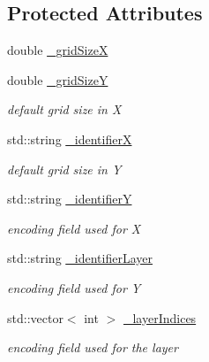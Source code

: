 \subsection*{Protected Attributes}
\begin{DoxyCompactItemize}
\item 
double \hyperlink{class_d_d4hep_1_1_d_d_segmentation_1_1_tiled_layer_segmentation_a8e60c82ed47b0b33c4c7918baea38296}{\_\-gridSizeX}
\item 
double \hyperlink{class_d_d4hep_1_1_d_d_segmentation_1_1_tiled_layer_segmentation_a71e5e4524b30002b118f464626558c39}{\_\-gridSizeY}
\begin{DoxyCompactList}\small\item\em default grid size in X \item\end{DoxyCompactList}\item 
std::string \hyperlink{class_d_d4hep_1_1_d_d_segmentation_1_1_tiled_layer_segmentation_ac79fffb5bdd56134ef2824ebb10ac1de}{\_\-identifierX}
\begin{DoxyCompactList}\small\item\em default grid size in Y \item\end{DoxyCompactList}\item 
std::string \hyperlink{class_d_d4hep_1_1_d_d_segmentation_1_1_tiled_layer_segmentation_af157c59a13254572f336a345463e993d}{\_\-identifierY}
\begin{DoxyCompactList}\small\item\em encoding field used for X \item\end{DoxyCompactList}\item 
std::string \hyperlink{class_d_d4hep_1_1_d_d_segmentation_1_1_tiled_layer_segmentation_a83e95ac7e65a186e5b15c4b72e57e1c6}{\_\-identifierLayer}
\begin{DoxyCompactList}\small\item\em encoding field used for Y \item\end{DoxyCompactList}\item 
std::vector$<$ int $>$ \hyperlink{class_d_d4hep_1_1_d_d_segmentation_1_1_tiled_layer_segmentation_a1988abb223b228480310aaf061d9210e}{\_\-layerIndices}
\begin{DoxyCompactList}\small\item\em encoding field used for the layer \item\end{DoxyCompactList}\item 

\end{DoxyCompactItemize}
